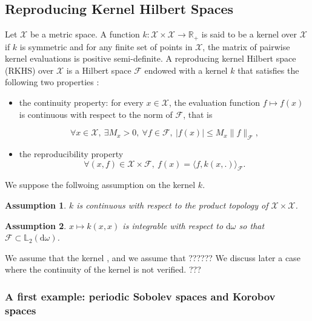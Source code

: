 \documentclass[twoside,11pt]{book}
\newtheorem{assumption}{Assumption}
\numberwithin{theorem}{chapter}
\numberwithin{definition}{chapter}
\numberwithin{proposition}{chapter}
\numberwithin{corollary}{chapter}
\numberwithin{example}{chapter}
\numberwithin{lemma}{chapter}
\numberwithin{assumption}{chapter}
\begin{document}
\subsection{Reproducing Kernel Hilbert Spaces}\label{subsec:rkhs}
Let $\mathcal{X}$ be a metric space. A function $k: \mathcal{X} \times \mathcal{X} \rightarrow \mathbb{R}_{+}$ is said to be a kernel over $\mathcal{X}$ if $k$ is symmetric and for any finite set of points in $\mathcal{X}$, the matrix of pairwise kernel evaluations is positive semi-definite. A reproducing kernel Hilbert space (RKHS) over $\mathcal{X}$ is a Hilbert space $\mathcal{F}$ endowed with a kernel $k$ that satisfies the following two properties \cite{BeTh11}: 
\begin{itemize}
\item the continuity property: for every $x \in \mathcal{X}$, the evaluation function $f \mapsto f(x)$ is continuous with respect to the norm of $\mathcal{F}$, that is

\begin{equation}
\forall x \in \mathcal{X}, \: \exists M_{x} >0 , \: \forall f \in \mathcal{F}, \: |f(x)| \leq M_{x} \|f\|_{\mathcal{F}},\nonumber
\end{equation} 
\item the reproducibility property\begin{equation}
\forall (x,f) \in \mathcal{X}\times\mathcal{F}, \: f(x) = \langle f, k(x,.) \rangle_{\mathcal{F}}. \nonumber
\end{equation}
\end{itemize}
We suppose the follwoing assumption on the kernel $k$.
\begin{assumption}\label{hyp:k_is_continuous}
$k$ is continuous with respect to the product topology of $\mathcal{X} \times \mathcal{X}$.
\end{assumption}

\begin{assumption}\label{hyp:the_diagonal_k_is_integrable}
$x \mapsto k(x,x)$ is integrable with respect to $\mathrm{d}\omega$ so that $\mathcal{F} \subset \mathbb{L}_{2}(\mathrm{d}\omega)$.
\end{assumption}

We assume that the kernel , and we assume that ??????
We discuss later a case where the continuity of the kernel is not verified. ???


\subsubsection{A first example: periodic Sobolev spaces and Korobov spaces}
\end{document}
